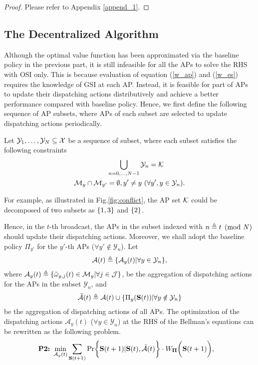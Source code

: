 \begin{proof}
    Please refer to Appendix \ref{append_1}.
\end{proof}

\subsection{The Decentralized Algorithm}
\label{subsec:ap_alg}
Although the optimal value function has been approximated via the baseline policy in the previous part, it is still infeasible for all the APs to solve the RHS with OSI only.
This is because evaluation of equation (\ref{w_ap}) and (\ref{w_es}) requires the knowledge of GSI at each AP.
Instead, it is feasible for part of APs to update their dispatching actions distributively and achieve a better performance compared with baseline policy.
Hence, we first define the following sequence of AP subsets, where APs of each subset are selected to update dispatching actions periodically.
\begin{definition}
    Let $\mathcal{Y}_{1}, \dots, \mathcal{Y}_{N} \subseteq \mathcal{X}$ be a sequence of subset, where each subset satisfies the following constraints
    \begin{align}
        &\bigcup_{n=0,\dots,N-1} \mathcal{Y}_{n} = \mathcal{K}
        \\
        \mathcal{M}_{y} \cap \mathcal{M}_{y'} &=\emptyset, y' \neq y~(\forall y',y \in \mathcal{Y}_{n}).
    \end{align}
\end{definition}
For example, as illustrated in Fig.\ref{fig:conflict}, the AP set $\mathcal{K}$ could be decomposed of two subsets as $\{1,3\}$ and $\{2\}$.

Hence, in the $t$-th broadcast, the APs in the subset indexed with $n \triangleq t \pmod{N}$ should update their dispatching actions.
Moreover, we shall adopt the baseline policy $\Pi_{y'}$ for the $y'$-th APs ($\forall y' \notin \mathcal{Y}_{n}$).
Let
\begin{align}
    \mathcal{A}(t) \triangleq \{\mathcal{A}_{y}(t) | \forall y\in\mathcal{Y}_{n}\},
\end{align}
where $\mathcal{A}_{y}(t) \triangleq \{ \tilde{\omega}_{y,j}(t)\in \mathcal{M}_{y}|\forall j\in\mathcal{J} \}$, 
be the aggregation of dispatching actions for the APs in the subset $\mathcal{Y}_{n}$, and
\begin{align}
    \tilde{\mathcal{A}}(t) \triangleq \mathcal{A}(t) \cup \{\Pi_{y}(\mathbf{S}(t)) | \forall y\notin\mathcal{Y}_{n}\}
\end{align}
be the aggregation of dispatching actions of all APs.
The optimization of the dispatching actions $\mathcal{A}_{y}(t)$ ($\forall y\in\mathcal{Y}_{n}$) at the RHS of the Bellman's equations can be rewritten as the following problem.
{\small
\begin{align}
    \textbf{P2:}~
    \min_{ \mathcal{A}_{y}(t) }
    &\sum_{\Stat(t+1)} \Pr\Brace{
        \Stat(t+1) | \Stat(t), \tilde{\mathcal{A}}(t)
    } \cdot W_{\Baseline}\Paren{\Stat(t+1)},
\end{align}
}

